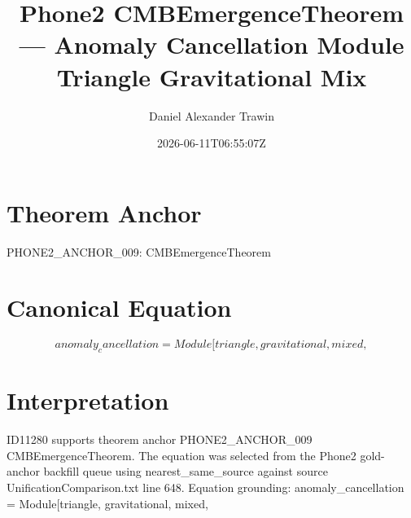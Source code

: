 \documentclass[11pt]{article}
\title{Phone2 CMBEmergenceTheorem — Anomaly Cancellation Module Triangle Gravitational Mix}
\author{Daniel Alexander Trawin}
\date{2026-06-11T06:55:07Z}
\begin{document}
\maketitle
\section*{Theorem Anchor}
PHONE2_ANCHOR_009: CMBEmergenceTheorem
\section*{Canonical Equation}
\[
anomaly_cancellation = Module[{triangle, gravitational, mixed},
\]
\section*{Interpretation}
ID11280 supports theorem anchor PHONE2_ANCHOR_009 CMBEmergenceTheorem. The equation was selected from the Phone2 gold-anchor backfill queue using nearest_same_source against source UnificationComparison.txt line 648. Equation grounding: anomaly_cancellation = Module[{triangle, gravitational, mixed},
\end{document}
